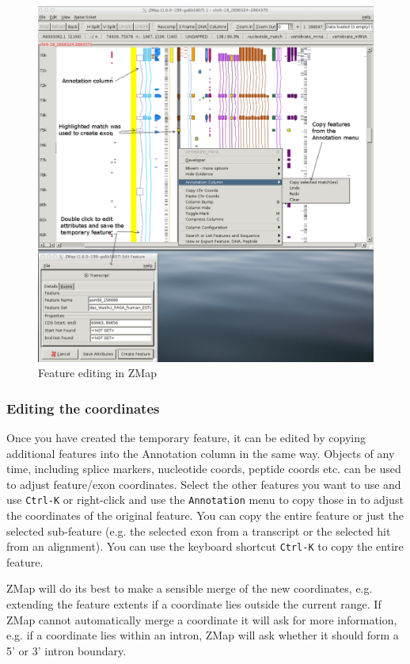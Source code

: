 \documentclass[letterpaper]{article}
\begin{document}
\begin{figure}
\centering
\color[rgb]{0.30980393,0.5058824,0.7411765}
\includegraphics[width=15.231cm]{img_editing_zmap.png}
\caption{Feature editing in ZMap}
\label{img_editing_zmap}
\end{figure}

\subsubsection{Editing the coordinates}
Once you have created the temporary feature, it can be edited by copying additional features into the Annotation column in the same way. Objects of any time, including splice markers, nucleotide coords, peptide coords etc. can be used to adjust feature/exon coordinates. Select the other features you want to use and use \lstinline{Ctrl-K} or right-click and use the \lstinline{Annotation} menu to copy those in to adjust the coordinates of the original feature. You can copy the entire feature or just the selected sub-feature (e.g. the selected exon from a transcript or the selected hit from an alignment). You can use the keyboard shortcut \lstinline{Ctrl-K} to copy the entire feature. 

ZMap will do its best to make a sensible merge of the new coordinates, e.g. extending the feature extents if a coordinate lies outside the current range. If ZMap cannot automatically merge a coordinate it will ask for more information, e.g. if a coordinate lies within an intron, ZMap will ask whether it should form a 5' or 3' intron boundary.
\end{document}
